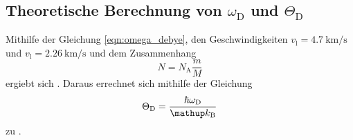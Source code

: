 \subsection{Theoretische Berechnung von $\omega_\mathrm{D}$ und $\Theta_\mathrm{D}$} %
\label{sub:theoretische_berechnung_von_omega_mathrm}

Mithilfe der Gleichung \eqref{eqn:omega_debye}, den Geschwindigkeiten $v_\text{l}=\SI{4.7}{\kilo\meter\per\second}$ und $v_\text{l}=\SI{2.26}{\kilo\meter\per\second}$ und dem Zusammenhang
\begin{equation}
	N = N_\text{A} \frac{m}{M}
\end{equation}
ergiebt sich .
Daraus errechnet sich mithilfe der Gleichung
\begin{equation}
	\Theta_\text{D} = \frac{\hbar \omega_\text{D}}{\kb}
\end{equation}
zu .